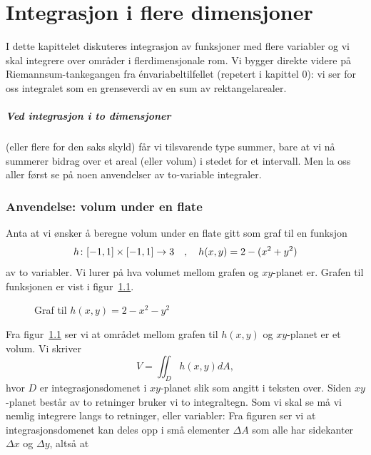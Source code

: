 \chapter{Integrasjon i flere dimensjoner}
\label{chap:Integrasjon}
I dette kapittelet diskuteres integrasjon av funksjoner med flere variabler og vi skal integrere over områder i flerdimensjonale rom. Vi bygger direkte videre på Riemannsum-tankegangen fra énvariabeltilfellet (repetert i kapittel 0): vi ser for oss integralet som en grenseverdi av en sum av rektangelarealer.

\paragraph{Ved integrasjon i to dimensjoner} (eller flere for den saks skyld) får vi tilsvarende type summer, bare at vi nå summerer bidrag over et areal (eller volum) i stedet for et intervall. Men la oss aller først se på noen anvendelser av to-variable integraler.

\subsection*{Anvendelse: volum under en flate} 
Anta at vi ønsker å beregne volum under en flate gitt som graf til en funksjon
\[h \colon [-1,1] \times [-1,1] \rightarrow 3\quad,\quad h(x,y)=2-(x^2+y^2)\]
av to variabler. Vi lurer på hva volumet mellom grafen og $xy$-planet er. Grafen til funksjonen er vist i figur~\ref{fig:1}.
\begin{figure}[ht]
\begin{center}
\end{center}
  \caption{Graf til $h(x,y)=2-x^2-y^2$}
    \label{fig:1}
\end{figure}

Fra figur~\ref{fig:1} ser vi at området mellom grafen til $h(x,y)$ og $xy$-planet er et volum. Vi skriver
\[V=\iint_D h(x,y) dA,\]
hvor $D$ er integrasjonsdomenet i $xy$-planet slik som angitt i teksten over. Siden $xy$-planet består av to retninger bruker vi to integraltegn. Som vi skal se må vi nemlig integrere langs to retninger, eller variabler: Fra figuren ser vi at integrasjonsdomenet kan deles opp i små elementer $\Delta A$ som alle har sidekanter \(\Delta x\) og \(\Delta y\), altså at

